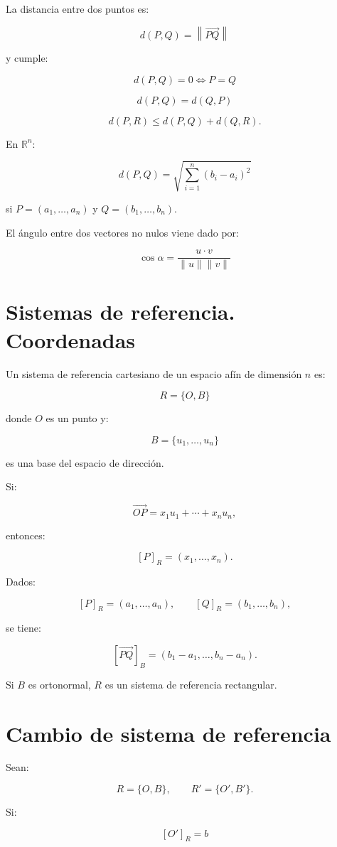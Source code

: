 \documentclass[11pt,a4paper]{article}
\newcommand{\R}{\mathbb{R}}
\begin{document}
La distancia entre dos puntos es:

\[
\boxed{
d(P,Q)=\left\|\overrightarrow{PQ}\right\|
}
\]

y cumple:

\[
d(P,Q)=0\iff P=Q
\]

\[
d(P,Q)=d(Q,P)
\]

\[
d(P,R)\leq d(P,Q)+d(Q,R).
\]

En $\R^n$:

\[
\boxed{
d(P,Q)=
\sqrt{\sum_{i=1}^{n}(b_i-a_i)^2}
}
\]

si $P=(a_1,\ldots,a_n)$ y $Q=(b_1,\ldots,b_n)$.

El ángulo entre dos vectores no nulos viene dado por:

\[
\boxed{
\cos\alpha=
\frac{u\cdot v}{\|u\|\|v\|}
}
\]

\section{Sistemas de referencia. Coordenadas}

Un sistema de referencia cartesiano de un espacio afín de dimensión $n$ es:

\[
\boxed{
R=\{O,B\}
}
\]

donde $O$ es un punto y:

\[
B=\{u_1,\ldots,u_n\}
\]

es una base del espacio de dirección.

Si:

\[
\overrightarrow{OP}=x_1u_1+\cdots+x_nu_n,
\]

entonces:

\[
\boxed{
[P]_R=(x_1,\ldots,x_n).
}
\]

Dados:

\[
[P]_R=(a_1,\ldots,a_n),
\qquad
[Q]_R=(b_1,\ldots,b_n),
\]

se tiene:

\[
\boxed{
[\overrightarrow{PQ}]_B=
(b_1-a_1,\ldots,b_n-a_n).
}
\]

Si $B$ es ortonormal, $R$ es un sistema de referencia rectangular.

\section{Cambio de sistema de referencia}

Sean:

\[
R=\{O,B\},
\qquad
R'=\{O',B'\}.
\]

Si:

\[
[O']_R=b
\]
\end{document}
